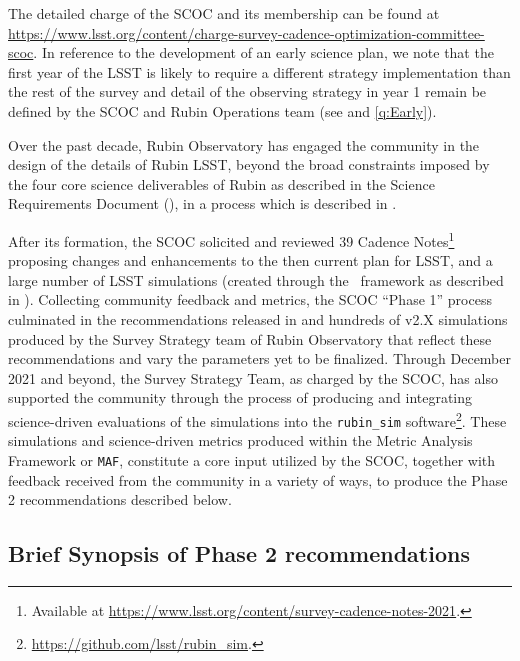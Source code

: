 The detailed charge of the SCOC and its membership can be found at \url{https://www.lsst.org/content/charge-survey-cadence-optimization-committee-scoc}. In reference to the development of an early science plan, we note that the first year of the LSST is likely to require a different strategy implementation than the rest of the survey and detail of the observing strategy in year 1 remain be defined by the SCOC and Rubin Operations team (see  and \autoref{q:Early}).

Over the past decade, Rubin Observatory has engaged the community in the design of the details of Rubin LSST, beyond the broad constraints imposed by the four core science deliverables of Rubin as described in the Science Requirements Document (), in a process which is described in \citet{2022ApJS..258....1B}. 

After its formation, the SCOC solicited %
and reviewed 39 Cadence Notes\footnote{\label{fn:cnotes}Available at \url{https://www.lsst.org/content/survey-cadence-notes-2021}.} proposing changes and enhancements to the then current plan for LSST, and a large number of LSST simulations (created through the \opsim\ framework as described in ). Collecting community feedback and metrics, the SCOC ``Phase 1'' process culminated in the recommendations released in  and hundreds of v2.X simulations produced by the Survey Strategy team of Rubin Observatory that reflect these recommendations and vary the parameters yet to be finalized. 
Through December 2021 and beyond, the Survey Strategy Team, as charged by the SCOC, has also supported the community through the process of producing and integrating science-driven evaluations of the simulations into the \texttt{rubin\_sim} software\footnote{\url{https://github.com/lsst/rubin_sim}.}. These simulations and science-driven metrics produced within the Metric Analysis Framework \citep{2014SPIE.9149E..0BJ} or \texttt{MAF},  constitute a core input utilized by the SCOC, together with feedback received from the community in a variety of ways, to produce the Phase 2 recommendations described below. 


\subsection{Brief Synopsis of Phase 2 recommendations}\label{sec:shortrec}

